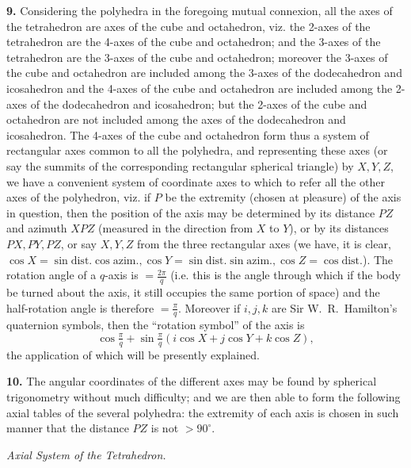 \documentclass[11pt]{article}
\begin{document}
\textbf{9.} Considering the polyhedra in the foregoing mutual connexion, all the axes of the tetrahedron are axes of the cube and octahedron, viz. the 2-axes of the tetrahedron are the 4-axes of the cube and octahedron; and the 3-axes of the tetrahedron are the 3-axes of the cube and octahedron; moreover the 3-axes of the cube and octahedron are included among the 3-axes of the dodecahedron and icosahedron and the 4-axes of the cube and octahedron are included among the 2-axes of the dodecahedron and icosahedron; but the 2-axes of the cube and octahedron are not included among the axes of the dodecahedron and icosahedron. The 4-axes of the cube and octahedron form thus a system of rectangular axes common to all the polyhedra, and representing these axes (or say the summits of the corresponding rectangular spherical triangle) by $X, Y, Z$, we have a convenient system of coordinate axes to which to refer all the other axes of the polyhedron, viz. if $P$ be the extremity (chosen at pleasure) of the axis in question, then the position of the axis may be determined by its distance $PZ$ and azimuth $XPZ$ (measured in the direction from $X$ to $Y$), or by its distances $PX, PY, PZ$, or say $X, Y, Z$ from the three rectangular axes (we have, it is clear, $\cos X = \sin\text{dist.}\cos\text{azim.}, \cos Y = \sin\text{dist.}\sin\text{azim.}, \cos Z = \cos\text{dist.}$). The rotation angle of a $q$-axis is $= \tfrac{2\pi}{q}$ (i.e. this is the angle through which if the body be turned about the axis, it still occupies the same portion of space) and the half-rotation angle is therefore $= \tfrac{\pi}{q}$. Moreover if $i, j, k$ are Sir W.~R.~Hamilton's quaternion symbols, then the ``rotation symbol'' of the axis is
\[ \cos\tfrac{\pi}{q} + \sin\tfrac{\pi}{q}(i\cos X + j\cos Y + k\cos Z), \]
the application of which will be presently explained.

\textbf{10.} The angular coordinates of the different axes may be found by spherical trigonometry without much difficulty; and we are then able to form the following axial tables of the several polyhedra: the extremity of each axis is chosen in such manner that the distance $PZ$ is not $> 90^\circ$.

\medskip
\begin{center}\emph{Axial System of the Tetrahedron.}\end{center}
\medskip
\end{document}
